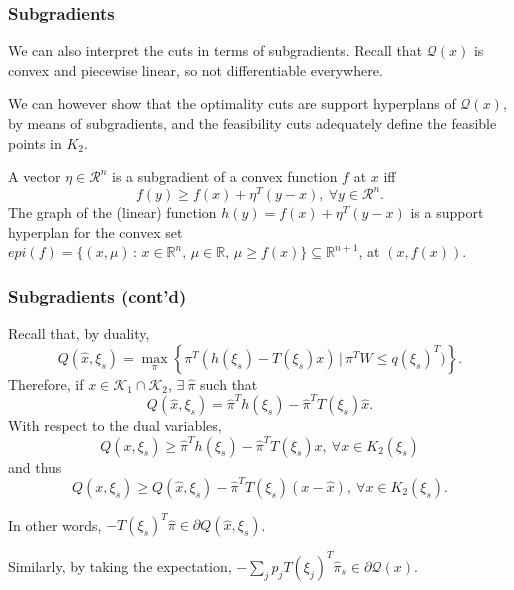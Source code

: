 \documentclass{beamer}
\def\rit{\mathcal{R}}
\def\cK{\mathcal{K}}
\begin{document}



\begin{frame}
\frametitle{Subgradients}

We can also interpret the cuts in terms of subgradients.
Recall that $\mathcal{Q}(x)$ is convex and piecewise linear, so not differentiable everywhere.
	
\mbox{}
	
We can however show that the optimality cuts are support hyperplans of $\mathcal{Q}(x)$, by means of subgradients, and the feasibility cuts adequately define the feasible points in $K_2$.

\mbox{}
	
A vector $\eta \in \rit^n$ is a {\red subgradient} of a convex function $f$ at $x$ iff
\[ f(y) \geq f(x) + \eta^T(y-x),\ \forall y \in \rit^n.\]
The graph of the (linear) function $h(y) = f(x) + \eta^T(y-x)$ is a support hyperplan for the convex set $epi(f) = \{ (x, \mu) \, : \, x \in \mathbb{R}^n,\, \mu \in \mathbb{R},\, \mu \ge f(x) \} \subseteq \mathbb{R}^{n+1}$, at $(x, f(x))$.
	
\end{frame}

\begin{frame}
\frametitle{Subgradients (cont'd)}

Recall that, by duality,
\[
Q(\hat{x}, \xi_s) =
\max_{\pi} \left\lbrace \pi^T(h(\xi_s)-T(\xi_s)x) \,|\, \pi^TW \leq q(\xi_s)^T) \right\rbrace.
\]
Therefore, if $x \in \cK_1 \cap \cK_2$, $\exists\ \hat{\pi}$ such that
\[
Q(\hat{x}, \xi_s) = \hat{\pi}^Th(\xi_s)-\hat{\pi}^TT(\xi_s)\hat{x}.
\]
With respect to the dual variables,
\[
Q(x, \xi_s) \geq \hat{\pi}^Th(\xi_s)-\hat{\pi}^TT(\xi_s) x,
\ \forall x \in K_2(\xi_s)
\]
and thus
\[
Q(x, \xi_s) \geq Q({\hat{x}, \xi_s}) - \hat{\pi}^TT(\xi_s) (x-\hat{x}),
\ \forall x \in K_2(\xi_s).
\]
	
In other words, $-T(\xi_s)^T\hat{\pi} \in \partial Q(\hat{x}, \xi_s)$.
	
\mbox{}
	
Similarly, by taking the expectation, $- \sum_j p_j T(\xi_j)^T\hat{\pi}_s \in \partial \mathcal{Q}(x)$.
	
\end{frame}
\end{document}
